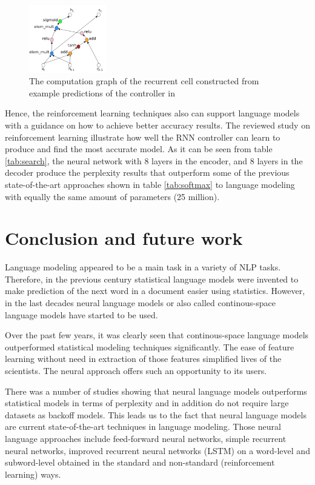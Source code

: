 \documentclass{IEEEtran}
\begin{document}
\begin{figure}[h]
	\centering
	\includegraphics[width=0.3\textwidth]{search}
	\caption{The computation graph of the recurrent cell constructed from example predictions of the controller in \cite{Quoc2017Reinforcement}}
	\label{fig:seach}
\end{figure}

Hence, the reinforcement learning techniques also can support language models with a guidance on how to achieve better accuracy results. The reviewed study on reinforcement learning illustrate how well the RNN controller can learn to produce and find the most accurate model. As it can be seen from table \ref{tab:search}, the neural network with 8 layers in the encoder, and 8 layers in the decoder produce the perplexity results that outperform some of the previous state-of-the-art approaches shown in table \ref{tab:softmax} to language modeling with equally the same amount of parameters (25 million).

\section{Conclusion and future work}

Language modeling appeared to be a main task in a variety of NLP tasks. Therefore, in the previous century statistical language models were invented to make prediction of the next word in a document easier using statistics. However, in the last decades neural language models or also called continous-space language models have started to be used.

Over the past few years, it was clearly seen that continous-space language models outperformed statistical modeling techniques significantly. The ease of feature learning without need in extraction of those features simplified lives of the scientists. The neural approach offers such an opportunity to its users.

There was a number of studies showing that neural language models outperforms statistical models in terms of perplexity and in addition do not require large datasets as backoff models. This leads us to the fact that neural language models are current state-of-the-art techniques in language modeling. Those neural language approaches include feed-forward neural networks, simple recurrent neural networks, improved recurrent neural networks (LSTM) on a word-level and subword-level obtained in the standard and non-standard (reinforcement learning) ways.
\end{document}
